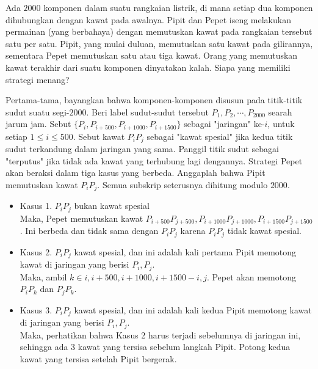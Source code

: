 \documentclass[12pt]{scrartcl}
\begin{document}
\begin{soaljawab}
Ada $2000$ komponen dalam suatu rangkaian listrik, di mana setiap dua komponen dihubungkan dengan kawat pada awalnya. Pipit dan Pepet iseng melakukan permainan (yang berbahaya) dengan memutuskan kawat pada rangkaian tersebut satu per satu. Pipit, yang mulai duluan, memutuskan satu kawat pada gilirannya, sementara Pepet memutuskan satu atau tiga kawat. Orang yang memutuskan kawat terakhir dari suatu komponen dinyatakan kalah. Siapa yang memiliki strategi menang?
    \begin{solusi}
        Pertama-tama, bayangkan bahwa komponen-komponen disusun pada titik-titik sudut suatu segi-$2000$. Beri label sudut-sudut tersebut $P_1, P_2, \cdots, P_{2000}$ searah jarum jam. Sebut $\{P_i, P_{i+500}, P_{i + 1000}, P_{i+1500}\}$ sebagai "jaringan" ke-$i$, untuk setiap $1 \le i \le 500$. Sebut kawat $P_iP_j$ sebagai "kawat spesial" jika kedua titik sudut terkandung dalam jaringan yang sama. Panggil titik sudut sebagai "terputus" jika tidak ada kawat yang terhubung lagi dengannya. Strategi Pepet akan beraksi dalam tiga kasus yang berbeda. Anggaplah bahwa Pipit memutuskan kawat $P_iP_j$. Semua subskrip seterusnya dihitung modulo $2000$.
        
        \begin{itemize}
            \item Kasus 1. $P_iP_j$ bukan kawat spesial\\
            Maka, Pepet memutuskan kawat $P_{i+500}P_{j+500}, P_{i+1000}P_{j+1000}, P_{i+1500}P_{j+1500}$. Ini berbeda dan tidak sama dengan $P_iP_j$ karena $P_iP_j$ tidak kawat spesial.

            \item Kasus 2. $P_iP_j$ kawat spesial, dan ini adalah kali pertama Pipit memotong kawat di jaringan yang berisi $P_i, P_j$.\\
            Maka, ambil $k \in {i, i+500, i+1000, i+1500} - {i, j}$. Pepet akan memotong $P_iP_k$ dan $P_j P_k$.

            \item Kasus 3. $P_iP_j$ kawat spesial, dan ini adalah kali kedua Pipit memotong kawat di jaringan yang berisi $P_i, P_j$.\\
            Maka, perhatikan bahwa Kasus 2 harus terjadi sebelumnya di jaringan ini, sehingga ada $3$ kawat yang tersisa sebelum langkah Pipit. Potong kedua kawat yang tersisa setelah Pipit bergerak.
        \end{itemize}


\end{solusi}
\end{soaljawab}
\end{document}
